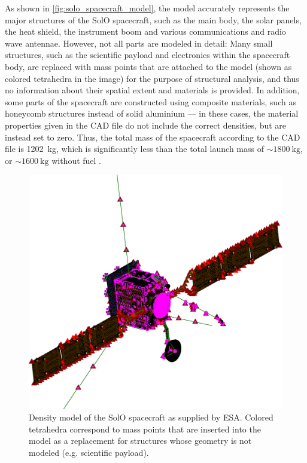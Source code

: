 As shown in \autoref{fig:solo_spacecraft_model}, the model accurately represents the major structures of the SolO spacecraft, such as the main body, the solar panels, the heat shield, the instrument boom and various communications and radio wave antennae. However, not all parts are modeled in detail: Many small structures, such as the scientific payload and electronics within the spacecraft body, are replaced with mass points that are attached to the model (shown as colored tetrahedra in the image) for the purpose of structural analysis, and thus no information about their spatial extent and materials is provided. In addition, some parts of the spacecraft are constructed using composite materials, such as honeycomb structures instead of solid aluminium --- in these cases, the material properties given in the \ac{CAD} file do not include the correct densities, but are instead set to zero. Thus, the total mass of the spacecraft according to the \ac{CAD} file is \SI{1202}{\kilogram}, which is significantly less than the total launch mass of $\sim\SI{1800}{\kilo\gram}$, or $\sim\SI{1600}{\kilo\gram}$ without fuel \citep{Mueller-2020-SolO}.

\begin{figure}
	\centering
	\includegraphics[width=0.7\linewidth]{images/solo_spacecraft_model}
	\caption[Density model of the \acl{SolO} spacecraft]{Density model of the \acs{SolO} spacecraft as supplied by ESA. Colored tetrahedra correspond to mass points that are inserted into the model as a replacement for structures whose geometry is not modeled (e.g. scientific payload).}
	\label{fig:solo_spacecraft_model}
\end{figure}

